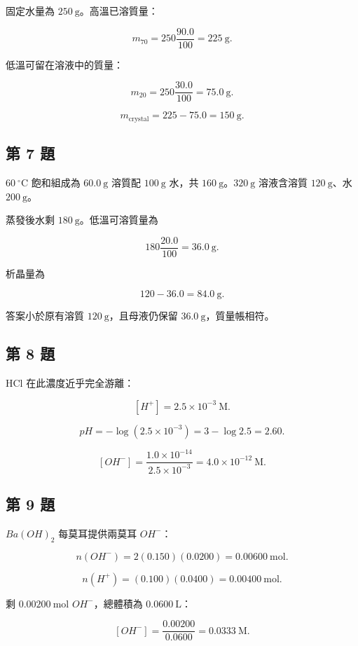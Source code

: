 \documentclass[11pt,a4paper]{article}
\begin{document}
固定水量為 \(250\ \mathrm g\)。高溫已溶質量：

\[
m_{70}=250\frac{90.0}{100}=225\ \mathrm g.
\]

低溫可留在溶液中的質量：

\[
m_{20}=250\frac{30.0}{100}=75.0\ \mathrm g.
\]

\[
m_{\mathrm{crystal}}=225-75.0=150\ \mathrm g.
\]

\subsection{第 7 題}\label{ux7b2c-7-ux984c}

\(60\ ^\circ\mathrm C\) 飽和組成為 \(60.0\ \mathrm g\) 溶質配 \(100\ \mathrm g\) 水，共 \(160\ \mathrm g\)。\(320\ \mathrm g\) 溶液含溶質 \(120\ \mathrm g\)、水 \(200\ \mathrm g\)。

蒸發後水剩 \(180\ \mathrm g\)。低溫可溶質量為

\[
180\frac{20.0}{100}=36.0\ \mathrm g.
\]

析晶量為

\[
120-36.0=84.0\ \mathrm g.
\]

答案小於原有溶質 \(120\ \mathrm g\)，且母液仍保留 \(36.0\ \mathrm g\)，質量帳相符。

\subsection{第 8 題}\label{ux7b2c-8-ux984c}

HCl 在此濃度近乎完全游離：

\[
[H^+]=2.5\times10^{-3}\ \mathrm M.
\]

\[
pH=-\log(2.5\times10^{-3})=3-\log2.5=2.60.
\]

\[
[OH^-]=\frac{1.0\times10^{-14}}{2.5\times10^{-3}}
=4.0\times10^{-12}\ \mathrm M.
\]

\subsection{第 9 題}\label{ux7b2c-9-ux984c}

\(Ba(OH)_2\) 每莫耳提供兩莫耳 \(OH^-\)：

\[
n(OH^-)=2(0.150)(0.0200)=0.00600\ \mathrm{mol}.
\]

\[
n(H^+)=(0.100)(0.0400)=0.00400\ \mathrm{mol}.
\]

剩 \(0.00200\ \mathrm{mol}\) \(OH^-\)，總體積為 \(0.0600\ \mathrm L\)：

\[
[OH^-]=\frac{0.00200}{0.0600}=0.0333\ \mathrm M.
\]
\end{document}
